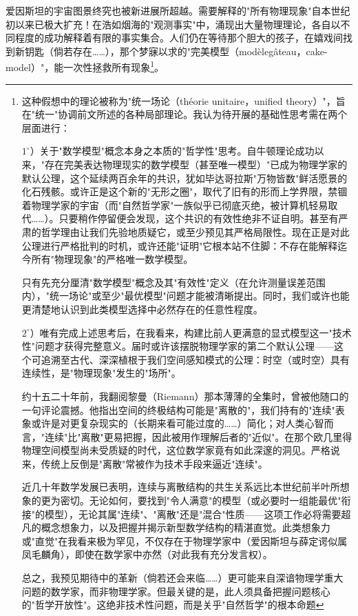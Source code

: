 爱因斯坦的宇宙图景终究也被新进展所超越。需要解释的"所有物理现象"自本世纪初以来已极大扩充！在浩如烟海的"观测事实"中，涌现出大量物理理论，各自以不同程度的成功解释着有限的事实集合。人们仍在等待那个胆大的孩子，在嬉戏间找到新钥匙（倘若存在……），那个梦寐以求的"完美模型（modèlegâteau，cake-model）"，能一次性拯救所有现象\footnote{这种假想中的理论被称为"统一场论（théorie unitaire，unified theory）"，旨在"统一"协调前文所述的各种局部理论。我认为待开展的基础性思考需在两个层面进行：

$1^{\circ}$）关于"数学模型"概念本身之本质的"哲学性"思考。自牛顿理论成功以来，"存在完美表达物理现实的数学模型（甚至唯一模型）"已成为物理学家的默认公理，这个延续两百余年的共识，犹如毕达哥拉斯"万物皆数"鲜活愿景的化石残骸。或许正是这个新的"无形之圈"，取代了旧有的形而上学界限，禁锢着物理学家的宇宙（而"自然哲学家"一族似乎已彻底灭绝，被计算机轻易取代……）。只要稍作停留便会发现，这个共识的有效性绝非不证自明。甚至有严肃的哲学理由让我们先验地质疑它，或至少预见其严格局限性。现在正是对此公理进行严格批判的时机，或许还能"证明"它根本站不住脚：不存在能解释迄今所有"物理现象"的严格唯一数学模型。

只有先充分厘清"数学模型"概念及其"有效性"定义（在允许测量误差范围内），"统一场论"或至少"最优模型"问题才能被清晰提出。同时，我们或许也能更清楚地认识到此类模型选择中必然存在的任意性程度。

$2^{\circ}$）唯有完成上述思考后，在我看来，构建比前人更满意的显式模型这一"技术性"问题才获得完整意义。届时或许该摆脱物理学家的第二个默认公理——这个可追溯至古代、深深植根于我们空间感知模式的公理：时空（或时空）具有连续性，是"物理现象"发生的"场所"。

约十五二十年前，我翻阅黎曼（Riemann）那本薄薄的全集时，曾被他随口的一句评论震撼。他指出空间的终极结构可能是"离散的"，我们持有的"连续"表象或许是对更复杂现实的（长期来看可能过度的……）简化；对人类心智而言，"连续"比"离散"更易把握，因此被用作理解后者的"近似"。在那个欧几里得物理空间模型尚未受质疑的时代，这位数学家竟有如此深邃的洞见。严格说来，传统上反倒是"离散"常被作为技术手段来逼近"连续"。

近几十年数学发展已表明，连续与离散结构的共生关系远比本世纪前半叶所想象的更为密切。无论如何，要找到"令人满意"的模型（或必要时一组能最优"衔接"的模型），无论其属"连续"、"离散"还是"混合"性质——这项工作必将需要超凡的概念想象力，以及把握并揭示新型数学结构的精湛直觉。此类想象力或"直觉"在我看来极为罕见，不仅存在于物理学家中（爱因斯坦与薛定谔似属凤毛麟角），即使在数学家中亦然（对此我有充分发言权）。

总之，我预见期待中的革新（倘若还会来临……）更可能来自深谙物理学重大问题的数学家，而非物理学家。但最关键的是，此人须具备把握问题核心的"哲学开放性"。这绝非技术性问题，而是关乎"自然哲学"的根本命题}。

